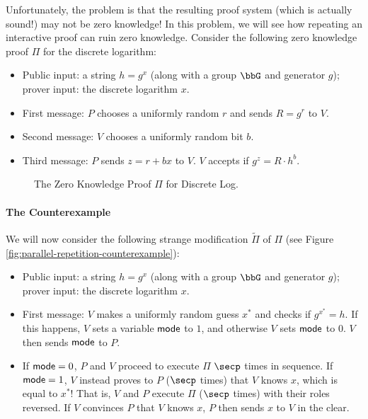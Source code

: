 \documentclass{article}
\begin{document}
Unfortunately, the problem is that the resulting proof system (which is actually sound!) may not be zero knowledge! In this problem, we will see how repeating an interactive proof can ruin zero knowledge. Consider the following zero knowledge proof $\Pi$ for the discrete logarithm:
\begin{itemize}
	\item Public input: a string $h = g^x$ (along with a group $\bbG$ and generator $g$); prover input: the discrete logarithm $x$.
	\item First message: $P$ chooses a uniformly random $r$ and sends $R = g^r$ to $V$.
	\item Second message: $V$ chooses a uniformly random bit $b$.
	\item Third message: $P$ sends $z= r + b x$ to $V$. $V$ accepts if $g^z = R \cdot h^b$.
\end{itemize}

\begin{figure}[ht]\centering
	\caption{The Zero Knowledge Proof $\Pi$ for Discrete Log.}
	\label{fig:discrete-log-pok}
\end{figure}
\newpage
\paragraph{The Counterexample}
\noindent We will now consider the following strange modification $\tilde \Pi$ of $\Pi$ (see Figure \ref{fig:parallel-repetition-counterexample}):
\begin{itemize}
	\item Public input: a string $h = g^x$ (along with a group $\bbG$ and generator $g$); prover input: the discrete logarithm $x$.
	\item First message: $V$ makes a uniformly random guess $x^*$ and checks if $g^{x^*} = h$. If this happens, $V$ sets a variable $\mathsf{mode}$ to $1$, and otherwise $V$ sets $\mathsf{mode}$ to $0$. $V$ then sends $\mathsf{mode}$ to $P$.
	\item If $\mathsf{mode} = 0$, $P$ and $V$ proceed to execute $\Pi$ $\secp$ times in sequence. If $\mathsf{mode} = 1$, $V$ instead proves to $P$ ($\secp$ times) that $V$ knows $x$, which is equal to $x^*$! That is, $V$ and $P$ execute $\Pi$ ($\secp$ times) with their roles reversed. If $V$ convinces $P$ that $V$ knows $x$, $P$ then sends $x$ to $V$ in the clear. 
\end{itemize}
\end{document}
